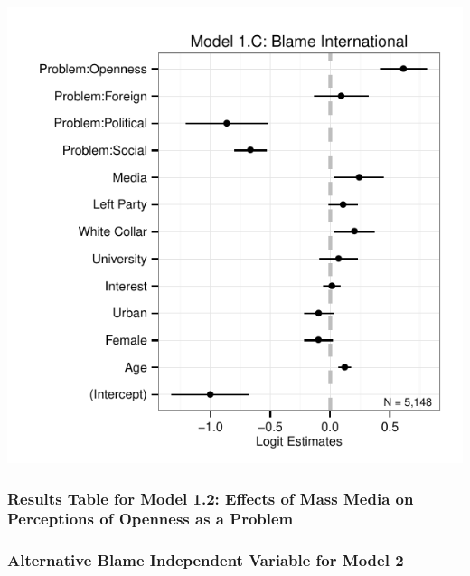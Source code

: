 \documentclass[12pt]{report}
\begin{document}
\begin{center}
\includegraphics{article1_blame_coefs1C.pdf}
\par\end{center}

\pagebreak

\begin{center}

\par\end{center}

\pagebreak

\subsubsection*{Results Table for Model 1.2: Effects of Mass Media on Perceptions
of Openness as a Problem}

\begin{center}

\par\end{center}

\pagebreak

\subsubsection*{Alternative Blame Independent Variable for Model 2}
\end{document}
